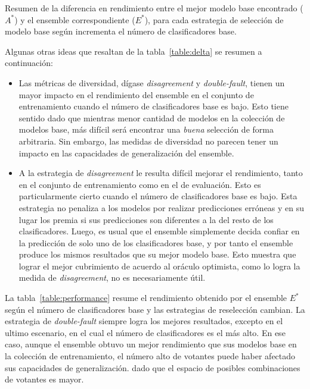 \begin{table}[H]
    \caption{Resumen de la diferencia en rendimiento entre el mejor modelo base encontrado ($A^*$) y el ensemble correspondiente ($E^*$), para cada estrategia de selección de modelo base según incrementa el número de clasificadores base.}
    \label{table:delta}
\end{table}

Algunas otras ideas que resaltan de la tabla~\ref{table:delta} se resumen a continuación:

\begin{itemize}
    \item
    Las métricas de diversidad, dígase \emph{disagreement} y \emph{double-fault}, tienen un mayor impacto en el rendimiento del ensemble en el conjunto de entrenamiento cuando el número de clasificadores base es bajo.
    Esto tiene sentido dado que mientras menor cantidad de modelos en la colección de modelos base, más difícil será encontrar una \textit{buena} selección de forma arbitraria.
    Sin embargo, las medidas de diversidad no parecen tener un impacto en las capacidades de generalización del ensemble.
    
    \item
    A la estrategia de \emph{disagreement} le resulta difícil mejorar el rendimiento, tanto en el conjunto de entrenamiento como en el de evaluación.
    Esto es particularmente cierto cuando el número de clasificadores base es bajo.
    Esta estrategia no penaliza a los modelos por realizar predicciones erróneas y en su lugar los premia si sus predicciones son diferentes a la del resto de los clasificadores.
    Luego, es usual que el ensemble simplemente decida confiar en la predicción de solo uno de los clasificadores base, y por tanto el ensemble produce los mismos resultados que su mejor modelo base.
    Esto muestra que lograr el mejor cubrimiento de acuerdo al oráculo optimista, como lo logra la medida de \emph{disagreement}, no es necesariamente útil.
\end{itemize}

La tabla~\ref{table:performance} resume el rendimiento obtenido por el ensemble $E^*$ según el número de clasificadores base y las estrategias de reselección cambian.
La estrategia de \emph{double-fault} siempre logra los mejores resultados, excepto en el ultimo escenario, en el cual el número de clasificadores es el más alto.
En ese caso, aunque el ensemble obtuvo un mejor rendimiento que sus modelos base en la colección de entrenamiento, el número alto de votantes puede haber afectado sus capacidades de generalización. dado que el espacio de posibles combinaciones de votantes es mayor.


